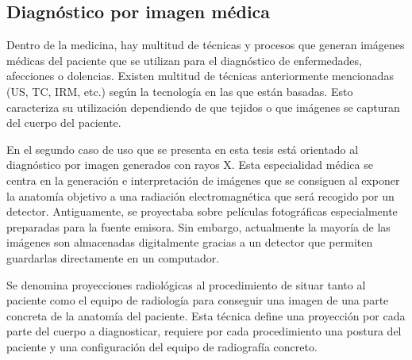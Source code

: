 \subsection{Diagnóstico por imagen médica}
\label{art:xraysim}

Dentro de la medicina, hay multitud de técnicas y procesos que generan imágenes médicas del paciente que se utilizan para el diagnóstico de enfermedades, afecciones o dolencias. Existen multitud de técnicas anteriormente mencionadas (\ac{US}, \ac{TC}, \ac{IRM}, etc.) según la tecnología en las que están basadas. Esto caracteriza su utilización dependiendo de que tejidos o que imágenes se capturan del cuerpo del paciente. 

En el segundo caso de uso que se presenta en esta tesis está orientado al diagnóstico por imagen generados con rayos X. Esta especialidad médica se centra en la generación e interpretación de imágenes que se consiguen al exponer la anatomía objetivo a una radiación electromagnética que será recogido por un detector. Antiguamente, se proyectaba sobre películas fotográficas especialmente preparadas para la fuente emisora. Sin embargo, actualmente la mayoría de las imágenes son almacenadas digitalmente gracias a un detector que permiten guardarlas directamente en un computador.

Se denomina proyecciones radiológicas al procedimiento de situar tanto al paciente como el equipo de radiología para conseguir una imagen de una parte concreta de la anatomía del paciente. Esta técnica define una proyección por cada parte del cuerpo a diagnosticar,  requiere por cada procedimiento una postura del paciente y una configuración del equipo de radiografía concreto.

